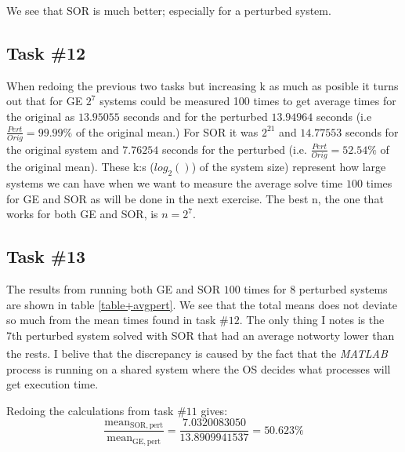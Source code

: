 \documentclass[10pt, a4paper]{article}
\newcommand{\matlab}{\small{\emph{MATLAB\textsuperscript{\textregistered}}}}
\begin{document}
We see that SOR is much better; especially for a perturbed system.

\subsection{Task \#12}
When redoing the previous two tasks but increasing k as much as posible it turns out that for GE $2^7$ systems could be measured 100 times to get average times for the original as $13.95055$ seconds and for the perturbed $13.94964$ seconds (i.e $\frac{Pert}{Orig}=99.99\%$ of the original mean.) For SOR it was $2^{21}$ and $14.77553$ seconds for the original system and $7.76254$ seconds for the perturbed (i.e. $\frac{Pert}{Orig}=52.54\%$ of the original mean). These k:s ($log_2()$) of the system size) represent how large systems we can have when we want to measure the average solve time $100$ times for GE and SOR as will be done in the next exercise. The best n, the one that works for both GE and SOR, is $n=2^7$.


\subsection{Task \#13}
The results from running both GE and SOR $100$ times for $8$ perturbed systems are shown in table \ref{table+avgpert}. We see that the total means does not deviate so much from the mean times found in task $\#12$. The only thing I notes is the 7th perturbed system solved with SOR that had an average notworty lower than the rests. I belive that the discrepancy is caused by the fact that the \matlab{} process is running on a shared system where the OS decides what processes will get execution time. 



Redoing the calculations from task $\#11$ gives:
\begin{displaymath}
	\frac{\mathrm{mean}_{\mathrm{SOR, pert}}}{\mathrm{mean}_{\mathrm{GE, pert}}}=\frac{7.0320083050}{13.8909941537} = 50.623\% %
\end{displaymath}
\end{document}
